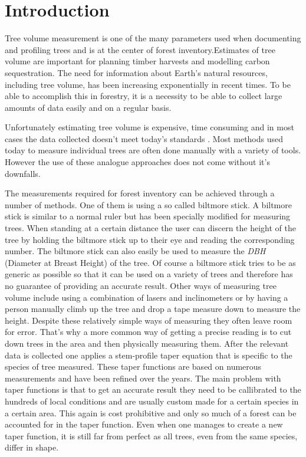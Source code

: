 

\newcommand{\degree}{$^\circ$}

\section{Introduction}
Tree volume measurement is one of the many parameters used when documenting and profiling trees and is at the center of forest inventory.Estimates of tree volume are important for planning timber harvests and modelling carbon sequestration. The need for information about Earth's natural resources, including tree volume, has been increasing exponentially in recent times. To be able to accomplish this in forestry, it is a necessity to be able to collect large amounts of data easily and on a regular basis. 

Unfortunately estimating tree volume is expensive, time consuming and in most cases the data collected doesn't meet today's standards \cite{digital imaged based tree measurement for forest inventory}.
Most methods used today to measure individual trees are often done manually with a variety of tools. However the use of these analogue approaches does not come without it's downfalls.

The measurements required for forest inventory can be achieved through a number of methods. One of them is using a so called biltmore stick. A biltmore stick is similar to a normal ruler but has been specially modified for measuring trees. When standing at a certain distance the user can discern the height of the tree by holding the biltmore stick up to their eye and reading the corresponding number. The biltmore stick can also easily be used to measure the \emph{DBH} (Diameter at Breast Height) of the tree. Of course a biltmore stick tries to be as generic as possible so that it can be used on a variety of trees and therefore has no guarantee of providing an accurate result. Other ways of measuring tree volume include using a combination of lasers and inclinometers or by having a person manually climb up the tree and drop a tape measure down to measure the height. Despite these relatively simple ways of measuring they often leave room for error. That’s why a more common way of getting a precise reading is to cut down trees in the area and then physically measuring them. After the relevant data is collected one applies a stem-profile taper equation that is specific to the species of tree measured. These taper functions are based on numerous measurements and have been refined over the years. The main problem with taper functions is that to get an accurate result they need to be callibrated to the hundreds of local conditions and are usually custom made for a certain species in a certain area. This again is cost prohibitive and only so much of a forest can be accounted for in the taper function. Even when one manages to create a new taper function, it is still far from perfect as all trees, even from the same species, differ in shape.

